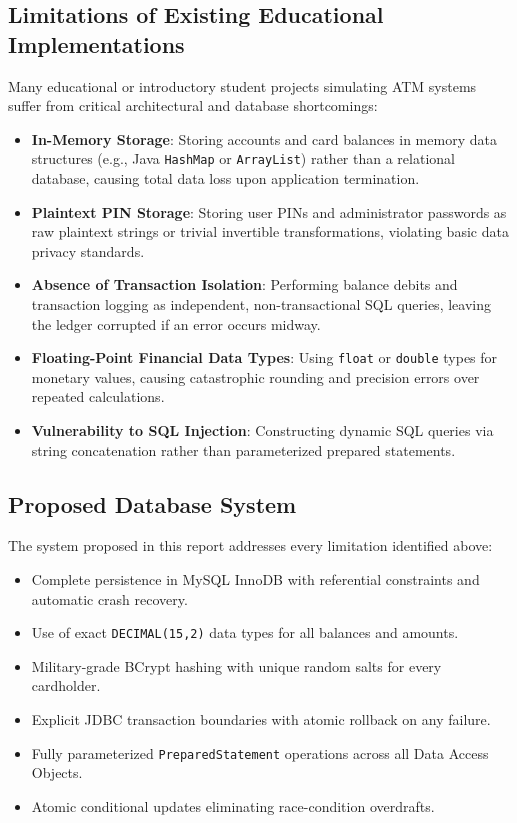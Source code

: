 \documentclass[11pt,a4paper]{report}
\begin{document}
\subsection{Limitations of Existing Educational Implementations}
Many educational or introductory student projects simulating ATM systems suffer from critical architectural and database shortcomings:
\begin{itemize}
    \item \textbf{In-Memory Storage}: Storing accounts and card balances in memory data structures (e.g., Java \texttt{HashMap} or \texttt{ArrayList}) rather than a relational database, causing total data loss upon application termination.
    \item \textbf{Plaintext PIN Storage}: Storing user PINs and administrator passwords as raw plaintext strings or trivial invertible transformations, violating basic data privacy standards.
    \item \textbf{Absence of Transaction Isolation}: Performing balance debits and transaction logging as independent, non-transactional SQL queries, leaving the ledger corrupted if an error occurs midway.
    \item \textbf{Floating-Point Financial Data Types}: Using \texttt{float} or \texttt{double} types for monetary values, causing catastrophic rounding and precision errors over repeated calculations.
    \item \textbf{Vulnerability to SQL Injection}: Constructing dynamic SQL queries via string concatenation rather than parameterized prepared statements.
\end{itemize}

\subsection{Proposed Database System}
The system proposed in this report addresses every limitation identified above:
\begin{itemize}
    \item Complete persistence in MySQL InnoDB with referential constraints and automatic crash recovery.
    \item Use of exact \texttt{DECIMAL(15,2)} data types for all balances and amounts.
    \item Military-grade BCrypt hashing with unique random salts for every cardholder.
    \item Explicit JDBC transaction boundaries with atomic rollback on any failure.
    \item Fully parameterized \texttt{PreparedStatement} operations across all Data Access Objects.
    \item Atomic conditional updates eliminating race-condition overdrafts.
\end{itemize}
\end{document}
